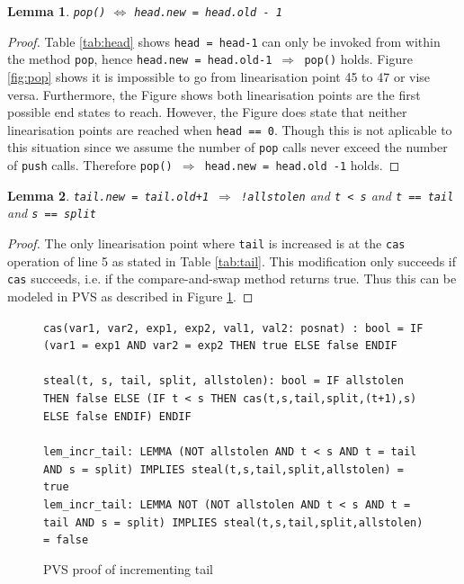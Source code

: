 \documentclass{sig-alternate-br}
\newtheorem{lemma}{Lemma}
\begin{document}
\begin{lemma}
	\texttt{pop()} $\iff$ \texttt{head.new = head.old - 1}
\end{lemma}
\begin{proof}
	Table \ref{tab:head} shows \texttt{head = head-1} can only be invoked from within the method \texttt{pop}, hence \texttt{head.new = head.old-1 $\Rightarrow$ pop()} holds.
	Figure \ref{fig:pop} shows it is impossible to go from linearisation point 45 to 47 or vise versa. Furthermore, the Figure shows both linearisation points are the first possible end states to reach. However, the Figure does state that neither linearisation points are reached when \texttt{head == 0}. Though this is not aplicable to this situation since we assume the number of \texttt{pop} calls never exceed the number of \texttt{push} calls. Therefore \texttt{pop() $\Rightarrow$ head.new = head.old -1} holds.
\end{proof}

\begin{lemma}
	\texttt{tail.new = tail.old+1 $\Rightarrow$ !allstolen} and \texttt{t < s} and \texttt{t == tail} and \texttt{s == split}
	\label{lem:incrtail}
\end{lemma}
\begin{proof}
	The only linearisation point where \texttt{tail} is increased is at the \texttt{cas} operation of line 5 as stated in Table \ref{tab:tail}. This modification only succeeds if \texttt{cas} succeeds, i.e. if the compare-and-swap method returns true. Thus this can be modeled in PVS as described in Figure \ref{pvs:tailincr}.
\end{proof}
\begin{figure}[h]
	\texttt{cas(var1, var2, exp1, exp2, val1, val2: posnat) : bool = IF (var1 = exp1 AND var2 = exp2 THEN true ELSE false ENDIF}\\\\
	\texttt{steal(t, s, tail, split, allstolen): bool = IF allstolen THEN false ELSE (IF t < s THEN cas(t,s,tail,split,(t+1),s) ELSE false ENDIF) ENDIF}\\\\
	\texttt{lem\_incr\_tail: LEMMA (NOT allstolen AND t < s AND t = tail AND s = split) IMPLIES steal(t,s,tail,split,allstolen) = true}\\
	\texttt{lem\_incr\_tail: LEMMA NOT (NOT allstolen AND t < s AND t = tail AND s = split) IMPLIES steal(t,s,tail,split,allstolen) = false}
	\caption{PVS proof of incrementing tail}
	\label{pvs:tailincr}
\end{figure}
\end{document}
